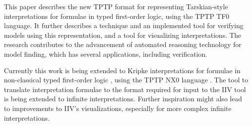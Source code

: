 \documentclass{easychair}
\begin{document}
This paper describes the new TPTP format for representing Tarskian-style interpretations for
formulae in typed first-order logic, using the TPTP TF0 language.
It further describes a technique and an implemented tool for verifying models using this 
representation, and a tool for visualizing interpretations.
The research contributes to the advancement of automated reasoning technology for model finding, 
which has several applications, including verification.

Currently this work is being extended to Kripke interpretations for formulae in non-classical 
typed first-order logic \cite{SF+22}, using the TPTP NX0 language \cite{Sut22-IGPL}.
The tool to translate interpretation formulae to the format required for input to the IIV tool is 
being extended to infinite interpretations.
Further inspiration might also lead to improvements to IIV's visualizations, especially for more
complex infinite interpretations.



\end{document}
